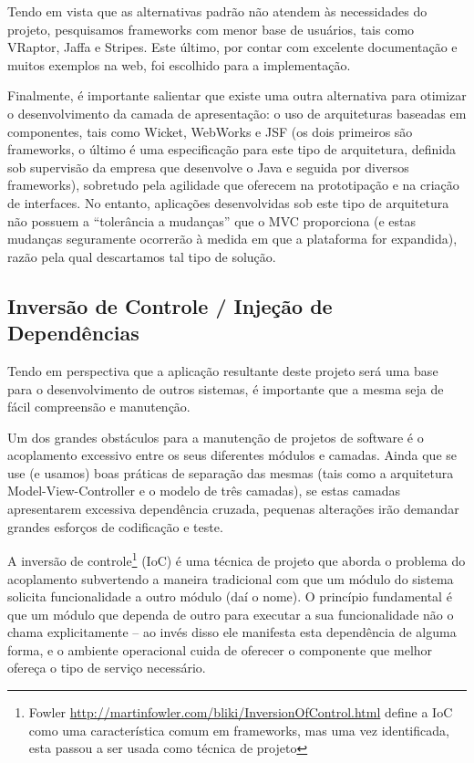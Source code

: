 \documentclass{abnt}
\begin{document}
Tendo em vista que as alternativas padrão não atendem às necessidades do projeto, pesquisamos frameworks com menor base de usuários, tais como VRaptor, Jaffa e Stripes. Este último, por contar com excelente documentação e muitos exemplos na web, foi escolhido para a implementação.

Finalmente, é importante salientar que existe uma outra alternativa para otimizar o desenvolvimento da camada de apresentação: o uso de arquiteturas baseadas em componentes, tais como Wicket, WebWorks e JSF (os dois primeiros são frameworks, o último é uma especificação para este tipo de arquitetura, definida sob supervisão da empresa que desenvolve o Java e seguida por diversos frameworks), sobretudo pela agilidade que oferecem na prototipação e na criação de interfaces. No entanto, aplicações desenvolvidas sob este tipo de arquitetura não possuem a “tolerância a mudanças” que o MVC proporciona (e estas mudanças seguramente ocorrerão à medida em que a plataforma for expandida), razão pela qual descartamos tal tipo de solução.

\subsection{Inversão de Controle / Injeção de Dependências}

Tendo em perspectiva que a aplicação resultante deste projeto será uma base para o desenvolvimento de outros sistemas, é importante que a mesma seja de fácil compreensão e manutenção.

Um dos grandes obstáculos para a manutenção de projetos de software é o acoplamento excessivo entre os seus diferentes módulos e camadas. Ainda que se use (e usamos) boas práticas de separação das mesmas (tais como a arquitetura Model-View-Controller e o modelo de três camadas), se estas camadas apresentarem excessiva dependência cruzada, pequenas alterações irão demandar grandes esforços de codificação e teste.

A inversão de controle\footnote{Fowler \url{http://martinfowler.com/bliki/InversionOfControl.html} define a IoC como uma característica comum em frameworks, mas uma vez identificada, esta passou a ser usada como técnica de projeto } (IoC) é uma técnica de projeto que aborda o problema do acoplamento subvertendo a maneira tradicional com que um módulo do sistema solicita funcionalidade a outro módulo (daí o nome). O princípio fundamental é que um módulo que dependa de outro para executar a sua funcionalidade não o chama explicitamente – ao invés disso ele manifesta esta dependência de alguma forma, e o ambiente operacional cuida de oferecer o componente que melhor ofereça o tipo de serviço necessário.
\end{document}
